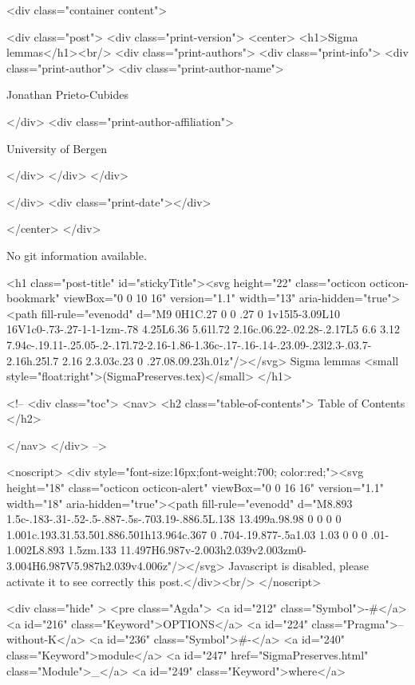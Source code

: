       <div class="container content">
        







<div class="post">
  <div class="print-version">
    <center>
      <h1>Sigma lemmas</h1><br/>
        <div class="print-authors">
          <div class="print-info">
            <div class="print-author">
              <div class="print-author-name">
                
                  Jonathan Prieto-Cubides
                
              </div>
              <div class="print-author-affiliation">
                
                  University of Bergen
                
                </div>
            </div>
          </div>
          
          
        </div>
        <div class="print-date"></div>
        
        
    </center>
  </div>

  
  No git information available.
  

  <h1 class="post-title" id="stickyTitle"><svg height="22" class="octicon octicon-bookmark" viewBox="0 0 10 16" version="1.1" width="13" aria-hidden="true"><path fill-rule="evenodd" d="M9 0H1C.27 0 0 .27 0 1v15l5-3.09L10 16V1c0-.73-.27-1-1-1zm-.78 4.25L6.36 5.61l.72 2.16c.06.22-.02.28-.2.17L5 6.6 3.12 7.94c-.19.11-.25.05-.2-.17l.72-2.16-1.86-1.36c-.17-.16-.14-.23.09-.23l2.3-.03.7-2.16h.25l.7 2.16 2.3.03c.23 0 .27.08.09.23h.01z"/></svg> Sigma lemmas <small style="float:right">(SigmaPreserves.tex)</small>
  </h1>

  <!-- 
  <div class="toc">
    <nav>
    <h2 class="table-of-contents"> Table of Contents </h2>
      

    </nav>
  </div>
   -->

  <noscript>
  <div style="font-size:16px;font-weight:700; color:red;"><svg height="18" class="octicon octicon-alert" viewBox="0 0 16 16" version="1.1" width="18" aria-hidden="true"><path fill-rule="evenodd" d="M8.893 1.5c-.183-.31-.52-.5-.887-.5s-.703.19-.886.5L.138 13.499a.98.98 0 0 0 0 1.001c.193.31.53.501.886.501h13.964c.367 0 .704-.19.877-.5a1.03 1.03 0 0 0 .01-1.002L8.893 1.5zm.133 11.497H6.987v-2.003h2.039v2.003zm0-3.004H6.987V5.987h2.039v4.006z"/></svg> Javascript is disabled, please activate it to see correctly this post.</div><br/>
  </noscript>

  <div class="hide" >
<pre class="Agda">
<a id="212" class="Symbol">{-#</a> <a id="216" class="Keyword">OPTIONS</a> <a id="224" class="Pragma">--without-K</a> <a id="236" class="Symbol">#-}</a>
<a id="240" class="Keyword">module</a> <a id="247" href="SigmaPreserves.html" class="Module">_</a> <a id="249" class="Keyword">where</a>

